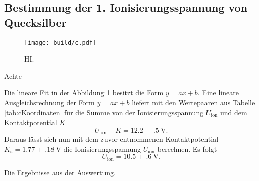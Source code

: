 \subsection{Bestimmung der 1. Ionisierungsspannung von Quecksilber}
\begin{figure}
	\centering
	\caption{HI.}
	\texttt{[image: build/c.pdf]}
	\label{fig:c}
\end{figure}
\begin{table}
	\caption{Achte}
	\centering
	
\end{table}
Die lineare Fit in der Abbildung \ref{fig:c} besitzt die Form $y=a x + b$. Eine lineare Ausgleichsrechnung der Form $y=a x+b$ liefert mit den Wertepaaren aus Tabelle \ref{tab:cKoordinaten} für die Summe von der Ionisierungsspannung $U_\text{ion}$ und dem Kontaktpotential $K$
\begin{displaymath}
	U_\text{ion}+K=\SI{12.2(5)}{\volt}\text{.}
\end{displaymath}
Daraus lässt sich nun mit dem zuvor entnommenen Kontaktpotential $K_\text{a}=\SI{1.77(18)}{\volt}$ die Ionisierungsspannung $U_\text{ion}$ berechnen. Es folgt
\begin{displaymath}
U_\text{ion}=\SI{10.5(6)}{\volt}\text{.}
\end{displaymath}

\begin{table}
	\caption{Die Ergebnisse aus der Auswertung.}
	\centering
	
	\label{tab:erg}
\end{table}

